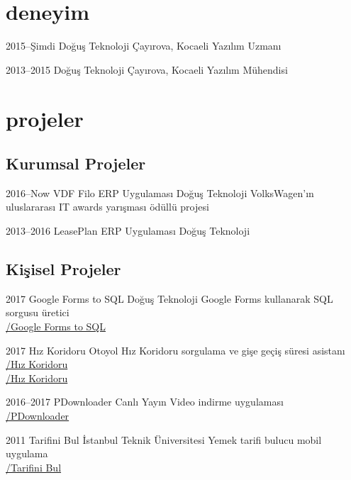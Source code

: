 \documentclass[]{../friggeri-cv} %
\begin{document}
\section{deneyim}

\begin{entrylist}

\entry
{2015--Şimdi}
{Doğuş Teknoloji}
{Çayırova, Kocaeli}
{Yazılım Uzmanı}

\entry
{2013--2015}
{Doğuş Teknoloji}
{Çayırova, Kocaeli}
{Yazılım Mühendisi}

\end{entrylist}

\section{projeler}

\subsection{Kurumsal Projeler}

\begin{entrylist}

\entry
{2016--Now}
{VDF Filo ERP Uygulaması}
{Doğuş Teknoloji}
{VolksWagen'ın uluslararası IT awards yarışması ödüllü projesi}

\entry
{2013--2016}
{LeasePlan ERP Uygulaması}
{Doğuş Teknoloji}
{}

\end{entrylist}

\subsection{Kişisel Projeler}

\begin{entrylist}

\entry
{2017}
{Google Forms to SQL}
{Doğuş Teknoloji}
{Google Forms kullanarak SQL sorgusu üretici
\\\href{https://github.com/suphero/Google-Forms-to-SQL}{\faGithub/Google Forms to SQL}}

\entry
{2017}
{Hız Koridoru}
{}
{Otoyol Hız Koridoru sorgulama ve gişe geçiş süresi asistanı
\\\href{https://play.google.com/store/apps/details?id=com.harunsokullu.speedcorridor}{\faAndroid/Hız Koridoru}
\\\href{https://itunes.apple.com/tr/app/h\%C4\%B1z-koridoru/id1265151812}{\faApple/Hız Koridoru}}

\entry
{2016--2017}
{PDownloader}
{}
{Canlı Yayın Video indirme uygulaması
\\\href{https://github.com/suphero/PDownloader}{\faGithub/PDownloader}}

\entry
{2011}
{Tarifini Bul}
{İstanbul Teknik Üniversitesi}
{Yemek tarifi bulucu mobil uygulama
\\\href{https://play.google.com/store/apps/details?id=com.tarifinibul}{\faAndroid/Tarifini Bul}}

\end{entrylist}

\footer
\end{document}
